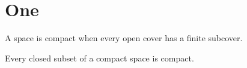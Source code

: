 \documentclass{article}
\begin{document}
\section{One}

\label{d:compact}
A space is compact when every open cover has a finite subcover.
\enddefinition

\theorem
Every closed subset of a compact space is compact.
\endtheorem
\end{document}
